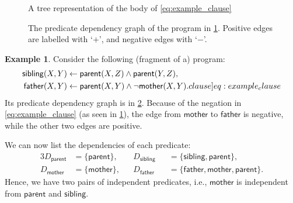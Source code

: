 \documentclass[letterpaper]{article}
\theoremstyle{definition}
\newtheorem{example}{Example}
\begin{document}
\begin{figure}
  \centering
  \caption{A tree representation of the body of \cref{eq:example_clause}}
  \label{fig:example_tree2}
\end{figure}
\begin{figure}
  \centering
  \caption{The predicate dependency graph of the program in \cref{ex:program}.
    Positive edges are labelled with `$+$', and negative edges with `$-$'.}
  \label{fig:predicate_dependencies}
\end{figure}

\begin{example} \label{ex:program}
  Consider the following (fragment of a) program:
  \begin{align}
    \mathsf{sibling}(X, Y) &\gets \mathsf{parent}(X, Z) \land \mathsf{parent}(Y, Z), \nonumber \\
    \mathsf{father}(X, Y) &\gets \mathsf{parent}(X, Y) \land \neg\mathsf{mother}(X, Y). \label[clause]{eq:example_clause}
  \end{align}
  Its predicate dependency graph is in \cref{fig:predicate_dependencies}.
  Because of the negation in \cref{eq:example_clause} (as seen in
  \cref{fig:example_tree2}), the edge from $\mathsf{mother}$ to
  $\mathsf{father}$ is negative, while the other two edges are positive.

  We can now list the dependencies of each predicate:
  \begin{alignat*}{3}
    D_{\mathsf{parent}} &= \{ \mathsf{parent} \}, && D_{\mathsf{sibling}}
    &&= \{\mathsf{sibling}, \mathsf{parent} \},\\
    D_{\mathsf{mother}} &= \{ \mathsf{mother} \}, && D_{\mathsf{father}}
    &&= \{ \mathsf{father}, \mathsf{mother}, \mathsf{parent} \}.
  \end{alignat*}
  Hence, we have two pairs of independent predicates, i.e., $\mathsf{mother}$ is
  independent from $\mathsf{parent}$ and $\mathsf{sibling}$.
\end{example}
\end{document}
